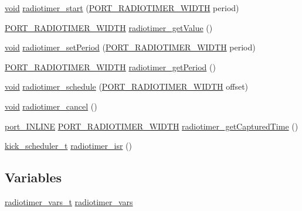 \begin{DoxyCompactItemize}
\item 
\hyperlink{usb__devapi_8h_afabf60e7f57651d6d595a02c75f07cd0}{void} \hyperlink{group__radiotimer_ga5afd5ed18d32fb118dca4ea99d181e35}{radiotimer\+\_\+start} (\hyperlink{z1_2board__info_8h_ac16e02aadd749b2d27638bed1a805a59}{P\+O\+R\+T\+\_\+\+R\+A\+D\+I\+O\+T\+I\+M\+E\+R\+\_\+\+W\+I\+D\+TH} period)
\item 
\hyperlink{z1_2board__info_8h_ac16e02aadd749b2d27638bed1a805a59}{P\+O\+R\+T\+\_\+\+R\+A\+D\+I\+O\+T\+I\+M\+E\+R\+\_\+\+W\+I\+D\+TH} \hyperlink{group__radiotimer_ga763b0da72c3bbf926f5a74283de1003c}{radiotimer\+\_\+get\+Value} ()
\item 
\hyperlink{usb__devapi_8h_afabf60e7f57651d6d595a02c75f07cd0}{void} \hyperlink{group__radiotimer_gaa976e43c1c475e9ff23b26ed06fa6918}{radiotimer\+\_\+set\+Period} (\hyperlink{z1_2board__info_8h_ac16e02aadd749b2d27638bed1a805a59}{P\+O\+R\+T\+\_\+\+R\+A\+D\+I\+O\+T\+I\+M\+E\+R\+\_\+\+W\+I\+D\+TH} period)
\item 
\hyperlink{z1_2board__info_8h_ac16e02aadd749b2d27638bed1a805a59}{P\+O\+R\+T\+\_\+\+R\+A\+D\+I\+O\+T\+I\+M\+E\+R\+\_\+\+W\+I\+D\+TH} \hyperlink{group__radiotimer_ga6e96a37a1a07cb7ec7639bfb44759437}{radiotimer\+\_\+get\+Period} ()
\item 
\hyperlink{usb__devapi_8h_afabf60e7f57651d6d595a02c75f07cd0}{void} \hyperlink{group__radiotimer_ga137a48c413a18f689b328b2be259704c}{radiotimer\+\_\+schedule} (\hyperlink{z1_2board__info_8h_ac16e02aadd749b2d27638bed1a805a59}{P\+O\+R\+T\+\_\+\+R\+A\+D\+I\+O\+T\+I\+M\+E\+R\+\_\+\+W\+I\+D\+TH} offset)
\item 
\hyperlink{usb__devapi_8h_afabf60e7f57651d6d595a02c75f07cd0}{void} \hyperlink{group__radiotimer_ga87b29bd5be3a34ea714da11d244e43f2}{radiotimer\+\_\+cancel} ()
\item 
\hyperlink{toolchain__defs_8h_ac176b886c94b2cf591ec32600fb61a07}{port\+\_\+\+I\+N\+L\+I\+NE} \hyperlink{z1_2board__info_8h_ac16e02aadd749b2d27638bed1a805a59}{P\+O\+R\+T\+\_\+\+R\+A\+D\+I\+O\+T\+I\+M\+E\+R\+\_\+\+W\+I\+D\+TH} \hyperlink{group__radiotimer_ga3f869c34f63741cf1aa6e43321662f78}{radiotimer\+\_\+get\+Captured\+Time} ()
\item 
\hyperlink{group__board_gac9ebdcc0a4f3c8422f5f4f0fbbe0ded0}{kick\+\_\+scheduler\+\_\+t} \hyperlink{group__radiotimer_ga45ba49be562da796046e90c03fdb1433}{radiotimer\+\_\+isr} ()
\end{DoxyCompactItemize}
\subsection*{Variables}
\begin{DoxyCompactItemize}
\item 
\hyperlink{structradiotimer__vars__t}{radiotimer\+\_\+vars\+\_\+t} \hyperlink{_open_mote-_c_c2538_2radiotimer_8c_ab0c3b58ed0e35f2c17645ac3b1406635}{radiotimer\+\_\+vars}
\end{DoxyCompactItemize}


